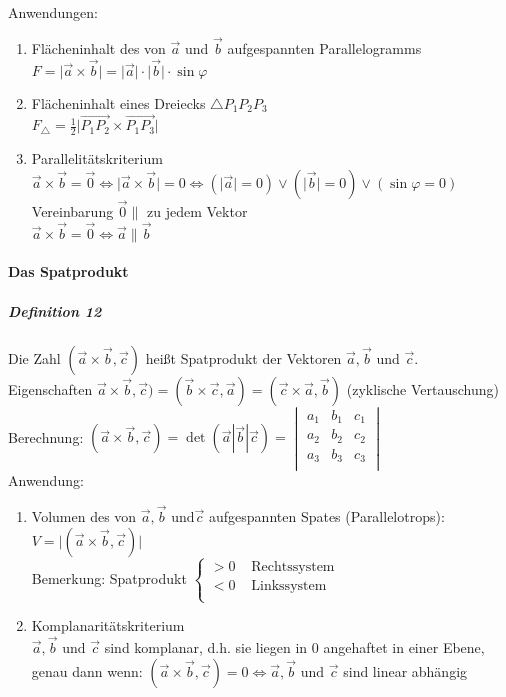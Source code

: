 \documentclass[a4paper]{scrartcl}
\begin{document}
Anwendungen:
\begin{enumerate}
\item Flächeninhalt des von $\vec{a}$ und $\vec{b}$ aufgespannten Parallelogramms $F=\lvert \vec{a} \times \vec{b} \rvert = \lvert \vec{a} \rvert \cdot \lvert \vec{b} \rvert \cdot \sin{\varphi}$
\item Flächeninhalt eines Dreiecks $\triangle P_1 P_2 P_3$\\
$F_\triangle = \frac{1}{2} \lvert \overrightarrow{P_1P_2} \times \overrightarrow{P_1P_3}\rvert$
\item Parallelitätskriterium\\
$\vec{a} \times \vec{b} = \vec{0} \Leftrightarrow \lvert \vec{a} \times \vec{b} \rvert = 0 \Leftrightarrow ( \lvert \vec{a} \rvert = 0) \vee ( \lvert \vec{b} \rvert = 0) \vee (\sin{\varphi} = 0)$\\
Vereinbarung $\vec{0} \parallel$ zu jedem Vektor\\
$\vec{a} \times \vec{b} = \vec{0} \Leftrightarrow \vec{a} \parallel \vec{b}$
\end{enumerate}

\paragraph{Das Spatprodukt}
\subparagraph{Definition 12} Die Zahl $(\vec{a} \times \vec{b}, \vec{c})$ heißt Spatprodukt der Vektoren $\vec{a},\vec{b}$ und $\vec{c}$.\\
Eigenschaften $\vec{a} \times \vec{b}, \vec{c}) = (\vec{b} \times \vec{c}, \vec{a}) = (\vec{c} \times \vec{a}, \vec{b})$ (zyklische Vertauschung)\\
Berechnung: $(\vec{a} \times \vec{b}, \vec{c}) = \det{(\vec{a} | \vec{b} | \vec{c})} = \begin{vmatrix} a_1 & b_1 & c_1\\
a_2 & b_2 & c_2\\
a_3 & b_3 & c_3\\ \end{vmatrix}$\\
Anwendung:
\begin{enumerate}
\item Volumen des von $\vec{a}, \vec{b} \text{ und} \vec{c}$ aufgespannten Spates (Parallelotrops): $V= \lvert ( \vec{a} \times \vec{b} , \vec{c})\rvert$\\
Bemerkung: Spatprodukt $\left\{ \begin{array}{rcl}
         >0
         & \text{ Rechtssystem} \\ 
        <0
         & \text{ Linkssystem} \\
                \end{array}\right.$
\item Komplanaritätskriterium\\
$\vec{a},\vec{b} \text{ und } \vec{c}$ sind komplanar, d.h. sie liegen in $0$ angehaftet in einer Ebene, genau dann wenn: $(\vec{a} \times \vec{b},\vec{c})=0 \Leftrightarrow \vec{a},\vec{b} \text{ und } \vec{c}$ sind linear abhängig
\end{enumerate}
\end{document}

